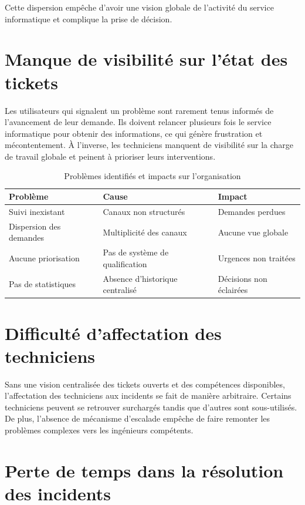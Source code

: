 \documentclass[12pt,a4paper,oneside]{report}
\renewcommand{\arraystretch}{1.3}
\begin{document}
Cette dispersion empêche d'avoir une vision globale de l'activité du service informatique et complique la prise de décision.

\section{Manque de visibilité sur l'état des tickets}

Les utilisateurs qui signalent un problème sont rarement tenus informés de l'avancement de leur demande. Ils doivent relancer plusieurs fois le service informatique pour obtenir des informations, ce qui génère frustration et mécontentement. À l'inverse, les techniciens manquent de visibilité sur la charge de travail globale et peinent à prioriser leurs interventions.

\begin{table}[htbp]
    \centering
    \caption{Problèmes identifiés et impacts sur l'organisation}
    \label{tab:problemes}
    \renewcommand{\arraystretch}{1.5}
    \begin{tabular}{p{4.5cm} p{4.5cm} p{4.5cm}}
        \toprule
        \textbf{Problème} & \textbf{Cause} & \textbf{Impact} \\
        \midrule
        Suivi inexistant & Canaux non structurés & Demandes perdues \\
        Dispersion des demandes & Multiplicité des canaux & Aucune vue globale \\
        Aucune priorisation & Pas de système de qualification & Urgences non traitées \\
        Pas de statistiques & Absence d'historique centralisé & Décisions non éclairées \\
        \bottomrule
    \end{tabular}
\end{table}

\section{Difficulté d'affectation des techniciens}

Sans une vision centralisée des tickets ouverts et des compétences disponibles, l'affectation des techniciens aux incidents se fait de manière arbitraire. Certains techniciens peuvent se retrouver surchargés tandis que d'autres sont sous-utilisés. De plus, l'absence de mécanisme d'escalade empêche de faire remonter les problèmes complexes vers les ingénieurs compétents.

\section{Perte de temps dans la résolution des incidents}
\end{document}
